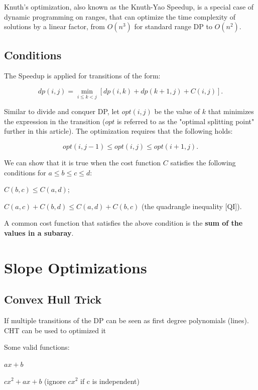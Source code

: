     Knuth's optimization, also known as the Knuth-Yao Speedup, is a special case of dynamic programming on ranges, 
    that can optimize the time complexity of solutions by a linear factor, from $O(n^3)$ for standard range DP to $O(n^2)$.

    \subsection{Conditions}

        The Speedup is applied for transitions of the form:

        $$dp(i, j) = \min_{i \leq k < j} [ dp(i, k) + dp(k+1, j) + C(i, j) ].$$

        Similar to divide and conquer DP, let $opt(i, j)$ be the value of $k$ that minimizes the expression in the transition 
        ($opt$ is referred to as the "optimal splitting point" further in this article). The optimization requires that the following holds:

        $$opt(i, j-1) \leq opt(i, j) \leq opt(i+1, j).$$

        We can show that it is true when the cost function 
        $C$ satisfies the following conditions for $a \leq b \leq c \leq d$:

        $C(b, c) \leq C(a, d)$;

        $C(a, c) + C(b, d) \leq C(a, d) + C(b, c)$ (the quadrangle inequality [QI]).

        A common cost function that satisfies the above condition is the \textbf{sum of the values in a subaray}.


\section{Slope Optimizations}

    \subsection{Convex Hull Trick}

        If multiple transitions of the DP can be seen as 
        first degree polynomials (lines). CHT can be used to optimized it

        Some valid functions:

        $ax + b$
        
        $cx^2 + ax + b$ 
        (ignore $cx^2$ if c is independent)

